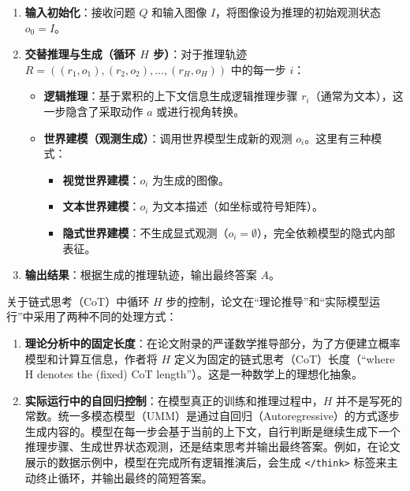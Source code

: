 \begin{enumerate}
\def\labelenumi{\arabic{enumi}.}
\tightlist
\item
  \textbf{输入初始化}：接收问题 \(Q\) 和输入图像 \(I\)，将图像设为推理的初始观测状态 \(o_0=I\)。
\item
  \textbf{交替推理与生成（循环 \(H\) 步）}：对于推理轨迹 \(R=((r_1,o_1),(r_2,o_2),\ldots,(r_H,o_H))\) 中的每一步 \(i\)：

  \begin{itemize}
  \tightlist
  \item
    \textbf{逻辑推理}：基于累积的上下文信息生成逻辑推理步骤 \(r_i\)（通常为文本），这一步隐含了采取动作 \(a\) 或进行视角转换。
  \item
    \textbf{世界建模（观测生成）}：调用世界模型生成新的观测 \(o_i\)。这里有三种模式：

    \begin{itemize}
    \tightlist
    \item
      \textbf{视觉世界建模}：\(o_i\) 为生成的图像。
    \item
      \textbf{文本世界建模}：\(o_i\) 为文本描述（如坐标或符号矩阵）。
    \item
      \textbf{隐式世界建模}：不生成显式观测（\(o_i=\emptyset\)），完全依赖模型的隐式内部表征。
    \end{itemize}
  \end{itemize}
\item
  \textbf{输出结果}：根据生成的推理轨迹，输出最终答案 \(A\)。
\end{enumerate}

关于链式思考（CoT）中循环 \(H\) 步的控制，论文在``理论推导''和``实际模型运行''中采用了两种不同的处理方式：

\begin{enumerate}
\def\labelenumi{\arabic{enumi}.}
\tightlist
\item
  \textbf{理论分析中的固定长度}：在论文附录的严谨数学推导部分，为了方便建立概率模型和计算互信息，作者将 \(H\) 定义为固定的链式思考（CoT）长度（``where H denotes the (fixed) CoT length''）。这是一种数学上的理想化抽象。
\item
  \textbf{实际运行中的自回归控制}：在模型真正的训练和推理过程中，\(H\) 并不是写死的常数。统一多模态模型（UMM）是通过自回归（Autoregressive）的方式逐步生成内容的。模型在每一步会基于当前的上下文，自行判断是继续生成下一个推理步骤、生成世界状态观测，还是结束思考并输出最终答案。例如，在论文展示的数据示例中，模型在完成所有逻辑推演后，会生成 \texttt{\textless{}/think\textgreater{}} 标签来主动终止循环，并输出最终的简短答案。
\end{enumerate}

